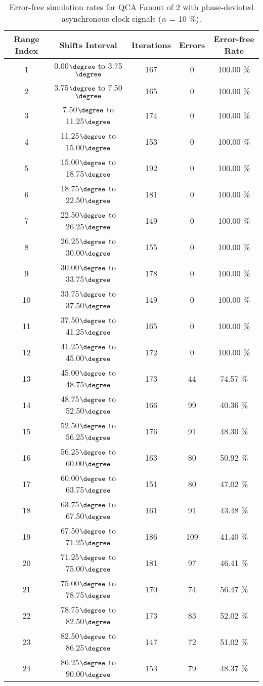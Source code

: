\flushleft
\begin{table}[h]
\begin{center}
\caption{Error-free simulation rates for QCA Fanout of 2 with phase-deviated asynchronous clock signals ($\alpha$ = 10 \%).}
\begin{tabular}{|c|c|c|c|c|}
\hline
\textbf{Range Index} & \textbf{Shifts Interval} & \textbf{Iterations} & \textbf{Errors} & \textbf{Error-free Rate} \\
\hline
1  &  0.00$\degree$ to  3.75$\degree$ & 167 &  0 & 100.00 \% \\
\hline
2  &  3.75$\degree$ to  7.50$\degree$ & 165 &  0 & 100.00 \% \\
\hline
3  &  7.50$\degree$ to 11.25$\degree$ & 174 &  0 & 100.00 \% \\
\hline
4  & 11.25$\degree$ to 15.00$\degree$ & 153 &  0 & 100.00 \% \\
\hline
5  & 15.00$\degree$ to 18.75$\degree$ & 192 &  0 & 100.00 \% \\
\hline
6  & 18.75$\degree$ to 22.50$\degree$ & 181 &  0 & 100.00 \% \\
\hline
7  & 22.50$\degree$ to 26.25$\degree$ & 149 &  0 & 100.00 \% \\
\hline
8  & 26.25$\degree$ to 30.00$\degree$ & 155 &  0 & 100.00 \% \\
\hline
9  & 30.00$\degree$ to 33.75$\degree$ & 178 &  0 & 100.00 \% \\
\hline
10 & 33.75$\degree$ to 37.50$\degree$ & 149 &  0 & 100.00 \% \\
\hline
11 & 37.50$\degree$ to 41.25$\degree$ & 165 &  0 & 100.00 \% \\
\hline
12 & 41.25$\degree$ to 45.00$\degree$ & 172 &  0 & 100.00 \% \\
\hline
13 & 45.00$\degree$ to 48.75$\degree$ & 173 & 44 &  74.57 \% \\
\hline
14 & 48.75$\degree$ to 52.50$\degree$ & 166 & 99 &  40.36 \% \\
\hline
15 & 52.50$\degree$ to 56.25$\degree$ & 176 & 91 &  48.30 \% \\
\hline
16 & 56.25$\degree$ to 60.00$\degree$ & 163 & 80 &  50.92 \% \\
\hline
17 & 60.00$\degree$ to 63.75$\degree$ & 151 & 80 &  47.02 \% \\
\hline
18 & 63.75$\degree$ to 67.50$\degree$ & 161 & 91 &  43.48 \% \\
\hline
19 & 67.50$\degree$ to 71.25$\degree$ & 186 & 109 &  41.40 \% \\
\hline
20 & 71.25$\degree$ to 75.00$\degree$ & 181 & 97 &  46.41 \% \\
\hline
21 & 75.00$\degree$ to 78.75$\degree$ & 170 & 74 &  56.47 \% \\
\hline
22 & 78.75$\degree$ to 82.50$\degree$ & 173 & 83 &  52.02 \% \\
\hline
23 & 82.50$\degree$ to 86.25$\degree$ & 147 & 72 &  51.02 \% \\
\hline
24 & 86.25$\degree$ to 90.00$\degree$ & 153 & 79 &  48.37 \% \\
\hline


\end{tabular}
\end{center}
\end{table}

